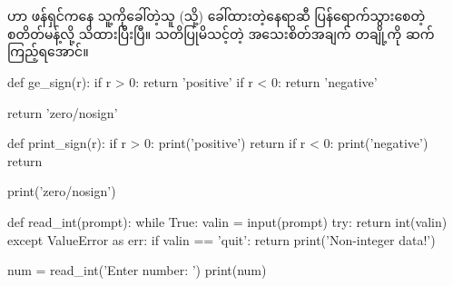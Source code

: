 \section{}
 ဟာ ဖန်ရှင်ကနေ သူ့ကိုခေါ်တဲ့သူ (သို့) ခေါ်ထားတဲ့နေရာဆီ ပြန်ရောက်သွားစေတဲ့ စတိတ်မန့်လို့ သိထားပြီးပြီ။ သတိပြုမိသင့်တဲ့ အသေးစိတ်အချက် တချို့ကို ဆက်ကြည့်ရအောင်။ 
%
\begin{py}
def ge_sign(r):
    if r > 0:
        return 'positive'
    if r < 0:
        return 'negative'

    return 'zero/nosign'

def print_sign(r):
    if r > 0:
        print('positive')
        return
    if r < 0:
        print('negative')
        return

    print('zero/nosign')
\end{py}
%


%
\begin{py}
def read_int(prompt):
    while True:
        valin = input(prompt)
        try:
            return int(valin)
        except ValueError as err:
            if valin == 'quit':
                return
            print('Non-integer data!')


num = read_int('Enter number: ')
print(num)
\end{py}
%

